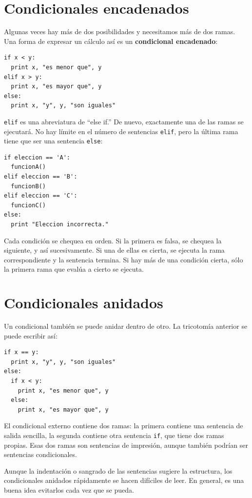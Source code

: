 \section{Condicionales encadenados}

Algunas veces hay más de dos posibilidades y necesitamos más de dos 
ramas. Una forma de expresar un cálculo así es un  {\bf
 condicional encadenado}:

\beforeverb
\begin{verbatim}
if x < y:
  print x, "es menor que", y
elif x > y:
  print x, "es mayor que", y
else:
  print x, "y", y, "son iguales"
\end{verbatim}
\afterverb
%
\texttt{elif} es una abreviatura de ``else if.''  De nuevo, exactamente
una de las ramas se ejecutará. No hay límite en el número de 
 sentencias \texttt{elif}, pero la última rama tiene que ser una sentencia \texttt{else}:


\beforeverb
\begin{verbatim}
if eleccion == 'A':
  funcionA()
elif eleccion == 'B':
  funcionB()
elif eleccion == 'C':
  funcionC()
else:
  print "Eleccion incorrecta."
\end{verbatim}
\afterverb
%
Cada condición se chequea en orden. Si la primera es falsa,
se chequea la siguiente, y así sucesivamente. Si una de ellas
es cierta, se ejecuta la rama correspondiente y la sentencia
termina. Si hay más de una condición cierta, sólo la primera
rama que evalúa a cierto se ejecuta.


\section{Condicionales anidados}

Un condicional también se puede anidar dentro de otro. La tricotomía
anterior se puede escribir así:

\beforeverb
\begin{verbatim}
if x == y:
  print x, "y", y, "son iguales"
else:
  if x < y:
    print x, "es menor que", y
  else:
    print x, "es mayor que", y
\end{verbatim}
\afterverb
%
El condicional externo contiene dos ramas: la primera 
contiene una sentencia de salida sencilla, la segunda 
contiene otra sentencia  \texttt{if}, que tiene dos ramas propias.
Esas dos ramas son sentencias de impresión, aunque también podrían 
ser sentencias condicionales.

Aunque la indentación o sangrado de las sentencias sugiere la
estructura, los condicionales anidados rápidamente se hacen difíciles de leer. 
 En general, es una buena idea evitarlos cada vez que se pueda.

